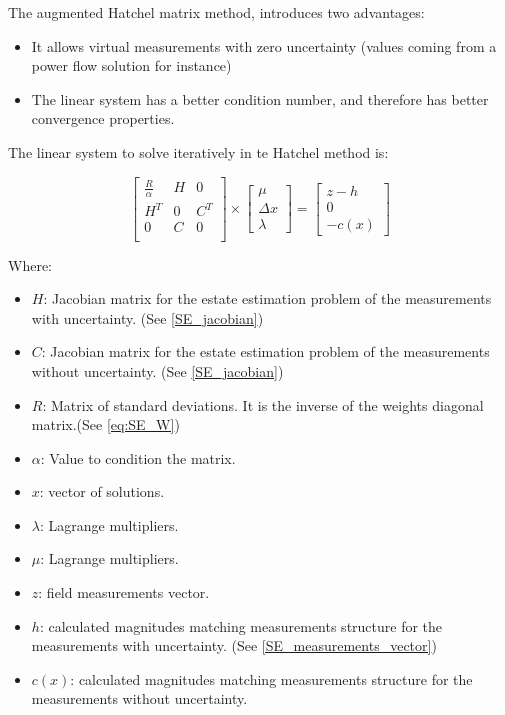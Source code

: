 \documentclass[a4paper,twoside,fleqn]{tufte-book}
\begin{document}
The augmented Hatchel matrix method, introduces two advantages: 
\begin{itemize}
	\item It allows virtual measurements with zero uncertainty (values coming from a power flow solution for instance)
	\item The linear system has a better condition number, and therefore has better convergence properties.
\end{itemize}

The linear system to solve iteratively in te Hatchel method is:

\begin{equation}
\begin{bmatrix}
\frac{R}{\alpha} & H & 0 \\
H^T & 0 & C^T \\
0 & C & 0 \\
\end{bmatrix}
\times
\begin{bmatrix}
\mu\\
\Delta x\\
\lambda
\end{bmatrix}
=
\begin{bmatrix}
z-h\\
0\\
-c(x)
\end{bmatrix}
\end{equation}

Where:

\begin{itemize}
	\item $H$: Jacobian matrix for the estate estimation problem of the measurements with uncertainty. (See \ref{SE_jacobian})
	\item $C$: Jacobian matrix for the estate estimation problem of the measurements without uncertainty. (See \ref{SE_jacobian})
	\item $R$: Matrix of standard deviations. It is the inverse of the weights diagonal matrix.(See \ref{eq:SE_W})
	\item $\alpha$: Value to condition the matrix. 
	\item $x$: vector of solutions.
	\item $\lambda$: Lagrange multipliers.
	\item $\mu$: Lagrange multipliers.
	\item $z$: field measurements vector.
	\item $h$: calculated magnitudes matching measurements structure for the measurements with uncertainty. (See \ref{SE_measurements_vector})
	\item $c(x)$: calculated magnitudes matching measurements structure for the measurements without uncertainty.
\end{itemize}
\end{document}
